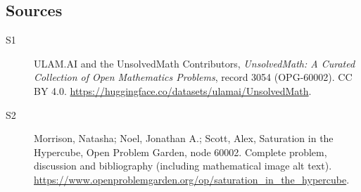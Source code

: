 \documentclass[11pt]{book}
\begin{document}
\subsection{Sources}
\begin{description}
\item[\hypertarget{source:3054:1}{S1}] ULAM.AI and the UnsolvedMath Contributors, \emph{UnsolvedMath: A Curated Collection of Open Mathematics Problems}, record 3054 (OPG-60002). CC BY 4.0. \url{https://huggingface.co/datasets/ulamai/UnsolvedMath}.
\item[\hypertarget{source:3054:2}{S2}] Morrison, Natasha; Noel, Jonathan A.; Scott, Alex, Saturation in the Hypercube, Open Problem Garden, node 60002. Complete problem, discussion and bibliography (including mathematical image alt text). \url{https://www.openproblemgarden.org/op/saturation_in_the_hypercube}.
\end{description}
\label{end:3054}
\end{document}
